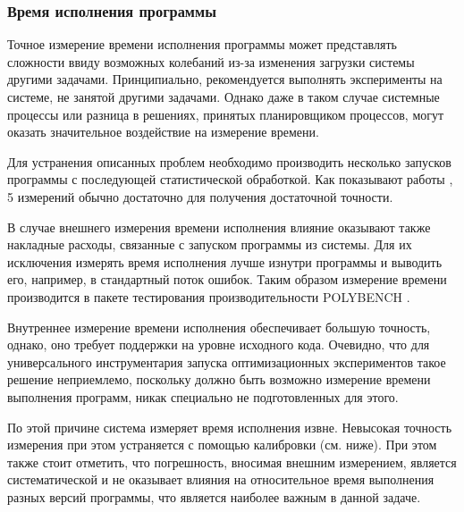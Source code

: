 \subsubsection{Время исполнения программы}
Точное измерение времени исполнения программы может представлять сложности ввиду возможных колебаний из-за изменения загрузки системы другими задачами. Принципиально, рекомендуется выполнять эксперименты на системе, не занятой другими задачами. Однако даже в таком случае системные процессы или разница в решениях, принятых планировщиком процессов, могут оказать значительное воздействие на измерение времени.

Для устранения описанных проблем необходимо производить несколько запусков программы с последующей статистической обработкой. Как показывают работы \cite{runs-number}, 5 измерений обычно достаточно для получения достаточной точности.

В случае внешнего измерения времени исполнения влияние оказывают также накладные расходы, связанные с запуском программы из системы. Для их исключения измерять время исполнения лучше изнутри программы и выводить его, например, в стандартный поток ошибок. Таким образом измерение времени производится в пакете тестирования производительности POLYBENCH \cite{polybench}.

Внутреннее измерение времени исполнения обеспечивает большую точность, однако, оно требует поддержки на уровне исходного кода. Очевидно, что для универсального инструментария запуска оптимизационных экспериментов такое решение неприемлемо, поскольку должно быть возможно измерение времени выполнения программ, никак специально не подготовленных для этого.

По этой причине система измеряет время исполнения извне. Невысокая точность измерения при этом устраняется с помощью калибровки (см. ниже). При этом также стоит отметить, что погрешность, вносимая внешним измерением, является систематической и не оказывает влияния на относительное время выполнения разных версий программы, что является наиболее важным в данной задаче.


